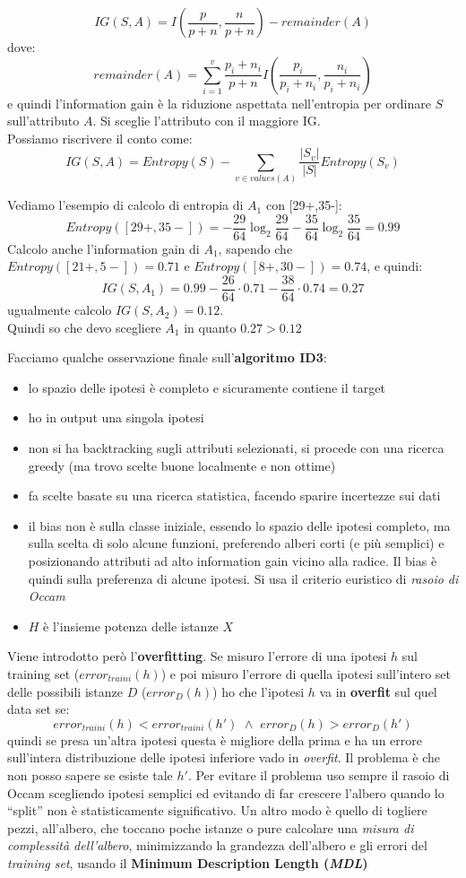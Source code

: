 \documentclass[a4paper,12pt, oneside]{book}
\begin{document}
\[IG(S,A)=I\left(\frac{p}{p+n},\frac{n}{p+n}\right)-remainder(A)\]
dove:
\[remainder(A)=\sum_{i=1}^v \frac{p_i+n_i}{p+n}
  I\left(\frac{p_i}{p_i+n_i},\frac{n_i}{p_i+n_i}\right)\]
e quindi l'information gain è la riduzione aspettata nell'entropia per ordinare
$S$ sull'attributo $A$. Si sceglie l'attributo con il maggiore IG.\\
Possiamo riscrivere il conto come:
\[IG(S,A)=Entropy(S)-\sum_{v\in values(A)}\frac{|S_v|}{|S|}Entropy(S_v)\]
\begin{esempio}
  Vediamo l'esempio di calcolo di entropia di $A_1$ con [29+,35-]:
  \[Entropy([29+,35-])=
    -\frac{29}{64}\log_2\frac{29}{64}-\frac{35}{64}\log_2\frac{35}{64}=0.99\]
  Calcolo anche l'information gain di $A_1$, sapendo che
  $Entropy([21+,5-])=0.71$ e $Entropy([8+,30-])=0.74$,
  e quindi:
  \[IG(S,A_1)=0.99-\frac{26}{64}\cdot 0.71-\frac{38}{64}\cdot 0.74=0.27\]
  ugualmente calcolo $IG(S,A_2)=0.12$. \\
  Quindi so che devo scegliere $A_1$ in quanto $0.27 > 0.12$
\end{esempio}
Facciamo qualche osservazione finale sull'\textbf{algoritmo ID3}:
\begin{itemize}
  \item lo spazio delle ipotesi è completo e sicuramente contiene il target
  \item ho in output una singola ipotesi
  \item non si ha backtracking sugli attributi selezionati, si procede con una
  ricerca greedy (ma trovo scelte buone localmente e non ottime)
  \item fa scelte basate su una ricerca statistica, facendo sparire incertezze
  sui dati
  \item il bias non è sulla classe iniziale, essendo lo spazio delle ipotesi
  completo, ma sulla scelta di solo alcune funzioni, preferendo alberi corti (e
  più semplici) e posizionando attributi ad alto information gain vicino alla
  radice. Il bias è quindi sulla preferenza di alcune ipotesi. Si usa il
  criterio euristico di \textit{rasoio di Occam}
  \item $H$ è l'insieme potenza delle istanze $X$
\end{itemize}
Viene introdotto però l'\textbf{overfitting}. Se misuro l'errore di una ipotesi
$h$ sul training set ($error_{traini}(h)$) e poi misuro l'errore di quella
ipotesi sull'intero set delle possibili istanze
$D$ ($error_D(h)$) ho che l'ipotesi $h$ va in \textbf{overfit} sul quel data set
se:
\[error_{traini}(h) < error_{traini}(h') \,\,\land
  \,\,error_D(h)>error_D(h')\]
quindi se presa un'altra ipotesi questa è migliore della prima e ha un errore
sull'intera distribuzione delle ipotesi inferiore vado in \textit{overfit}. Il
problema è che non posso sapere se esiste tale $h'$. Per evitare il problema uso
sempre il rasoio di Occam scegliendo ipotesi semplici ed evitando di far
crescere l'albero quando lo ``split'' non è statisticamente significativo. Un
altro modo è quello di togliere pezzi, all'albero, che toccano poche istanze o
pure calcolare una \textit{misura di complessità dell'albero}, minimizzando la
grandezza dell'albero e gli errori del \textit{training set}, usando il
\textbf{Minimum Description Length (\textit{MDL})}
\end{document}
